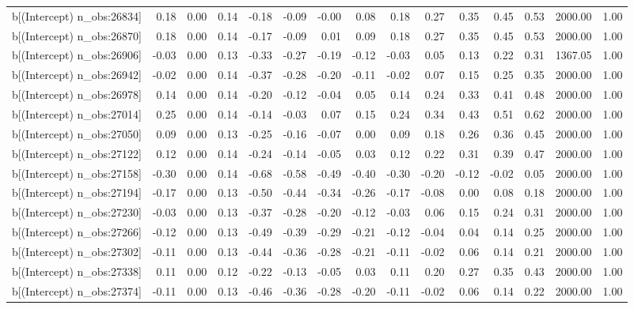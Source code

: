 \begin{table}[ht]
\begin{tabular}{rrrrrrrrrrrrrrr}
  b[(Intercept) n\_obs:26834] & 0.18 & 0.00 & 0.14 & -0.18 & -0.09 & -0.00 & 0.08 & 0.18 & 0.27 & 0.35 & 0.45 & 0.53 & 2000.00 & 1.00 \\ 
  b[(Intercept) n\_obs:26870] & 0.18 & 0.00 & 0.14 & -0.17 & -0.09 & 0.01 & 0.09 & 0.18 & 0.27 & 0.35 & 0.45 & 0.53 & 2000.00 & 1.00 \\ 
  b[(Intercept) n\_obs:26906] & -0.03 & 0.00 & 0.13 & -0.33 & -0.27 & -0.19 & -0.12 & -0.03 & 0.05 & 0.13 & 0.22 & 0.31 & 1367.05 & 1.00 \\ 
  b[(Intercept) n\_obs:26942] & -0.02 & 0.00 & 0.14 & -0.37 & -0.28 & -0.20 & -0.11 & -0.02 & 0.07 & 0.15 & 0.25 & 0.35 & 2000.00 & 1.00 \\ 
  b[(Intercept) n\_obs:26978] & 0.14 & 0.00 & 0.14 & -0.20 & -0.12 & -0.04 & 0.05 & 0.14 & 0.24 & 0.33 & 0.41 & 0.48 & 2000.00 & 1.00 \\ 
  b[(Intercept) n\_obs:27014] & 0.25 & 0.00 & 0.14 & -0.14 & -0.03 & 0.07 & 0.15 & 0.24 & 0.34 & 0.43 & 0.51 & 0.62 & 2000.00 & 1.00 \\ 
  b[(Intercept) n\_obs:27050] & 0.09 & 0.00 & 0.13 & -0.25 & -0.16 & -0.07 & 0.00 & 0.09 & 0.18 & 0.26 & 0.36 & 0.45 & 2000.00 & 1.00 \\ 
  b[(Intercept) n\_obs:27122] & 0.12 & 0.00 & 0.14 & -0.24 & -0.14 & -0.05 & 0.03 & 0.12 & 0.22 & 0.31 & 0.39 & 0.47 & 2000.00 & 1.00 \\ 
  b[(Intercept) n\_obs:27158] & -0.30 & 0.00 & 0.14 & -0.68 & -0.58 & -0.49 & -0.40 & -0.30 & -0.20 & -0.12 & -0.02 & 0.05 & 2000.00 & 1.00 \\ 
  b[(Intercept) n\_obs:27194] & -0.17 & 0.00 & 0.13 & -0.50 & -0.44 & -0.34 & -0.26 & -0.17 & -0.08 & 0.00 & 0.08 & 0.18 & 2000.00 & 1.00 \\ 
  b[(Intercept) n\_obs:27230] & -0.03 & 0.00 & 0.13 & -0.37 & -0.28 & -0.20 & -0.12 & -0.03 & 0.06 & 0.15 & 0.24 & 0.31 & 2000.00 & 1.00 \\ 
  b[(Intercept) n\_obs:27266] & -0.12 & 0.00 & 0.13 & -0.49 & -0.39 & -0.29 & -0.21 & -0.12 & -0.04 & 0.04 & 0.14 & 0.25 & 2000.00 & 1.00 \\ 
  b[(Intercept) n\_obs:27302] & -0.11 & 0.00 & 0.13 & -0.44 & -0.36 & -0.28 & -0.21 & -0.11 & -0.02 & 0.06 & 0.14 & 0.21 & 2000.00 & 1.00 \\ 
  b[(Intercept) n\_obs:27338] & 0.11 & 0.00 & 0.12 & -0.22 & -0.13 & -0.05 & 0.03 & 0.11 & 0.20 & 0.27 & 0.35 & 0.43 & 2000.00 & 1.00 \\ 
  b[(Intercept) n\_obs:27374] & -0.11 & 0.00 & 0.13 & -0.46 & -0.36 & -0.28 & -0.20 & -0.11 & -0.02 & 0.06 & 0.14 & 0.22 & 2000.00 & 1.00 \\ 

\end{tabular}
\end{table}

